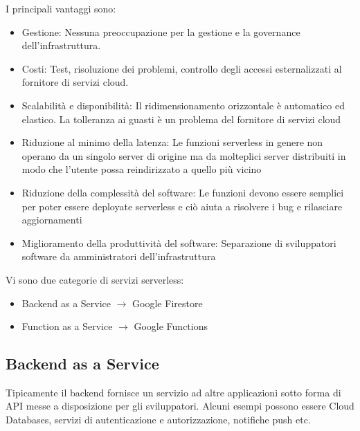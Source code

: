 \documentclass{article}
\begin{document}
		I principali vantaggi sono:
		\begin{itemize}
		    \item Gestione: Nessuna preoccupazione per la gestione e la governance dell'infrastruttura.
		    \item Costi: Test, risoluzione dei problemi, controllo degli accessi esternalizzati al fornitore di servizi cloud.
		    \item Scalabilità e disponibilità: Il ridimensionamento orizzontale è automatico ed elastico. La tolleranza ai guasti è un problema del fornitore di servizi cloud
		    \item Riduzione al minimo della latenza: Le funzioni serverless in genere non operano da un singolo server di origine ma da molteplici server distribuiti in modo che l'utente possa reindirizzato a quello più vicino
		    \item Riduzione della complessità del software: Le funzioni devono essere semplici per poter essere deployate serverless e ciò aiuta a risolvere i bug e rilasciare aggiornamenti
		    \item Miglioramento della produttività del software: Separazione di sviluppatori software da amministratori dell'infrastruttura
		\end{itemize}
		Vi sono due categorie di servizi serverless:
		\begin{itemize}
		\item Backend as a Service $\rightarrow$ Google Firestore
		\item Function as a Service $\rightarrow$ Google Functions
		\end{itemize}
		
		\subsection{Backend as a Service}
		Tipicamente il backend fornisce un servizio ad altre applicazioni sotto forma di API messe a disposizione per gli sviluppatori. Alcuni esempi possono essere Cloud Databases, servizi di autenticazione e autorizzazione, notifiche push etc.
		
\end{document}
